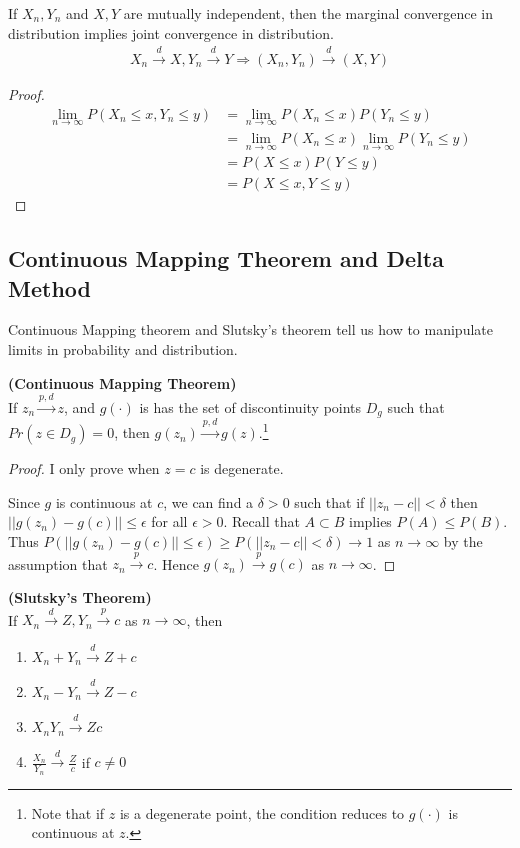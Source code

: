 \documentclass[11pt]{article} %
\theoremstyle{definition}
\numberwithin{defn}{subsection}
\numberwithin{thm}{subsection}
\numberwithin{ex}{subsection}
\newcommand{\dlim}{\overset{d}{\rightarrow}}
\newcommand{\ninfty}{n\rightarrow\infty}
\begin{document}
\begin{thm}
	If $X_n,Y_n$ and $X,Y$ are mutually independent, then the marginal convergence in distribution implies joint convergence in distribution.
	\begin{align*}
	X_n\dlim X, Y_n\dlim Y \Rightarrow (X_n,Y_n)\dlim (X,Y)
	\end{align*}
	\begin{proof}
		\begin{align*}
		\lim_{\ninfty}P(X_n\le x,Y_n\le y)&=\lim_{\ninfty}P(X_n\le x)P(Y_n\le y)\\
		&=\lim_{\ninfty}P(X_n\le x)\lim_{\ninfty}P(Y_n\le y)\\
		&=P(X\le x)P(Y\le y)\\
		&=P(X\le x,Y\le y)
		\end{align*}
	\end{proof}
\end{thm}

\subsection{Continuous Mapping Theorem and Delta Method}
Continuous Mapping theorem and Slutsky's theorem tell us how to manipulate limits in probability and distribution.

\begin{thm}\label{thm:CMT}
	\textbf{(Continuous Mapping Theorem)}\\
	If $z_n\overset{p,d}{\rightarrow}z$, and $g(\cdot)$ is has the set of discontinuity points $D_g$ such that $Pr(z\in D_g)=0$, then $g(z_n)\overset{p,d}{\rightarrow}g(z)$.\footnote{Note that if $z$ is a degenerate point, the condition reduces to $g(\cdot)$ is continuous at $z$.}
	\begin{proof}
		I only prove when $z=c$ is degenerate.
		
		Since $g$ is continuous at $c$, we can find a $\delta>0$ such that if $||z_n-c||<\delta$ then $||g(z_n)-g(c)||\le\epsilon$ for all $\epsilon>0$. Recall that $A\subset B$ implies $P(A)\le P(B)$. Thus $P(||g(z_n)-g(c)||\le\epsilon)\ge P(||z_n-c||<\delta)\rightarrow1$ as $n\rightarrow\infty$ by the assumption that $z_n\overset{p}{\rightarrow}c$. Hence $g(z_n)\overset{p}{\rightarrow}g(c)$ as $n\rightarrow\infty$.
	\end{proof}
\end{thm}

\begin{thm}\label{thm:slutsky}
	\textbf{(Slutsky's Theorem)}\\
	If $X_n\overset{d}{\rightarrow}Z,Y_n\overset{p}{\rightarrow}c$ as $n\rightarrow\infty$, then
	\begin{enumerate}
		\item $X_n+Y_n\overset{d}{\rightarrow}Z+c$
		\item $X_n-Y_n\dlim Z-c$
		\item $X_nY_n\overset{d}{\rightarrow}Zc$
		\item $\frac{X_n}{Y_n}\overset{d}{\rightarrow}\frac{Z}{c}$ if $c\neq0$
	\end{enumerate}
\end{thm}
\end{document}
